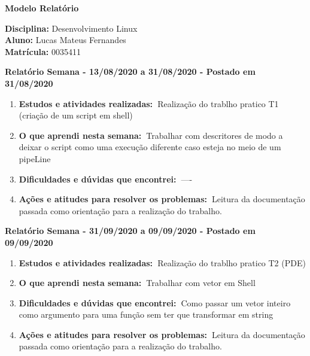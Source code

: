 \documentclass[10pt,a4paper]{report}
\newcommand{\bola}{\resizebox{12pt}{!}{$\bullet$\ }}
\newcommand{\relatorio}[3]{\vspace{3mm}\noindent\bola\textbf{Relatório Semana - #1 a #2 - Postado em #3}}
\newcommand{\atividades}{\textbf{Estudos e atividades realizadas:\ }}
\newcommand{\aprendizado}{\textbf{O que aprendi nesta semana:\ }}
\newcommand{\duvidas}{\textbf{Dificuldades e dúvidas que encontrei:\ }}
\newcommand{\acoes}{\textbf{Ações e atitudes para resolver os problemas:\ }}
\begin{document}
\begin{center} \LARGE
   \textbf{Modelo Relatório} \\[10mm]
\end{center}

\bgroup \large 
\noindent
\textbf{Disciplina:} Desenvolvimento Linux \\
\textbf{Aluno:} Lucas Mateus Fernandes\\
\textbf{Matrícula:} 0035411\\[5mm]
\egroup

\relatorio{13/08/2020}{31/08/2020}{31/08/2020}
\begin{enumerate}
	\item \atividades Realização do trablho pratico T1 (criação de um script em shell)
	
	\item \aprendizado Trabalhar com descritores de modo a deixar o script como uma execução diferente caso esteja no meio de um pipeLine
	
	\item \duvidas ----
	
	\item \acoes Leitura da documentação passada como orientação para a realização do trabalho.
\end{enumerate}


\relatorio{31/09/2020}{09/09/2020}{09/09/2020}
\begin{enumerate}
	\item \atividades Realização do trablho pratico T2 (PDE)
	
	\item \aprendizado Trabalhar com vetor em Shell
	
	\item \duvidas Como passar um vetor inteiro como argumento para uma função sem ter que transformar em string
	
	\item \acoes Leitura da documentação passada como orientação para a realização do trabalho.
\end{enumerate}
\end{document}

